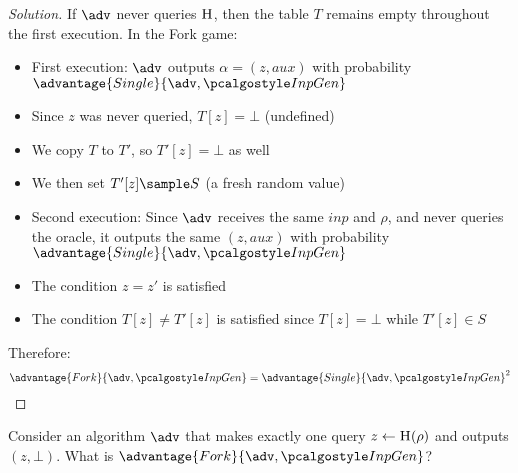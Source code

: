 \begin{proof}[Solution]
  If $\adv$ never queries ${\normalfont\textsc{H}}$, then the table $T$ remains empty throughout the first execution. In the Fork game:
  
  \begin{itemize}
    \item First execution: $\adv$ outputs $\alpha = (z, \mathit{aux})$ with probability $\advantage{Single}{\adv, \algo{InpGen}}$
    \item Since $z$ was never queried, $T[z] = \bot$ (undefined)
    \item We copy $T$ to $T'$, so $T'[z] = \bot$ as well
    \item We then set $T'[z] \sample S$ (a fresh random value)
    \item Second execution: Since $\adv$ receives the same $\mathit{inp}$ and $\rho$, and never queries the oracle, it outputs the same $(z, \mathit{aux})$ with probability $\advantage{Single}{\adv, \algo{InpGen}}$
    \item The condition $z = z'$ is satisfied
    \item The condition $T[z] \neq T'[z]$ is satisfied since $T[z] = \bot$ while $T'[z] \in S$
  \end{itemize}
  
  Therefore:
  \[
  \advantage{Fork}{\adv, \algo{InpGen}} = \advantage{Single}{\adv, \algo{InpGen}}^2
  \]
\end{proof}

\begin{exercise}
  Consider an algorithm $\adv$ that makes exactly one query $z \gets {\normalfont\textsc{H}}(\rho)$ and outputs $(z, \bot)$. What is $\advantage{Fork}{\adv, \algo{InpGen}}$?
\end{exercise}

